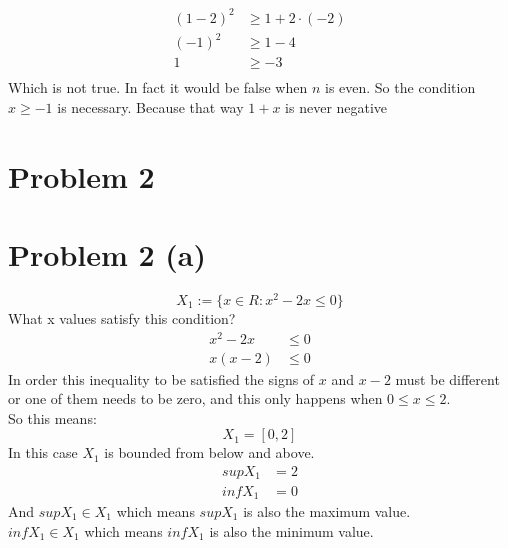 \documentclass{article}
\begin{document}
\begin{align*}
   (1 - 2)^2 &\geq 1 + 2 \cdot (-2) \\
   (-1)^2    &\geq 1 - 4            \\
   1         &\geq -3               \\
\end{align*}
Which is not true. In fact it would be false when \(n\) is even. So the condition \(x \geq -1\) is necessary. Because that way \(1 + x\) is never negative

\section*{Problem 2}
\section*{Problem 2 (a)}
\[
   X_1 := \{x \in R: x^2 - 2x \leq 0\}
\]
What x values satisfy this condition? \\
\begin{align*}
   x^2 - 2x &\leq 0 \\
   x(x - 2) &\leq 0
\end{align*}
In order this inequality to be satisfied the signs of \(x\) and \(x - 2\) must be different or one of them needs to be zero, 
and this only happens when \(0 \leq x \leq 2\). \\
So this means:
\[
   X_1 = [0, 2]
\]
In this case \(X_1\) is bounded from below and above.\\
\begin{align*}
   sup X_1 &= 2 \\
   inf X_1 &= 0
\end{align*}
And \(sup X_1 \in X_1\) which means \(sup X_1\) is also the maximum value.\\
\(inf X_1 \in X_1\) which means \(inf X_1\) is also the minimum value.\\
\end{document}
